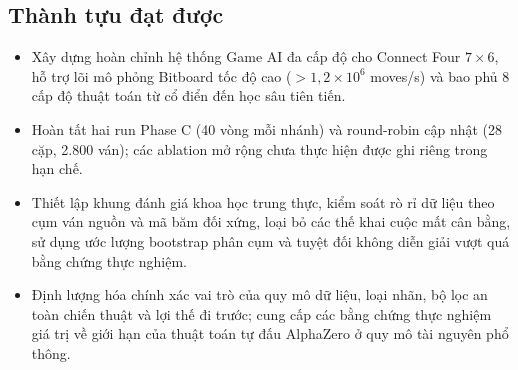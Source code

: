 \documentclass[11pt, a4paper]{article}
\begin{document}
\subsection{Thành tựu đạt được}
\begin{itemize}
    \item Xây dựng hoàn chỉnh hệ thống Game AI đa cấp độ cho Connect Four $7 \times 6$, hỗ trợ lõi mô phỏng Bitboard tốc độ cao ($>1{,}2 \times 10^6$ moves/s) và bao phủ 8 cấp độ thuật toán từ cổ điển đến học sâu tiên tiến.
    \item Hoàn tất hai run Phase C (40 vòng mỗi nhánh) và round-robin cập nhật (28 cặp, 2.800 ván); các ablation mở rộng chưa thực hiện được ghi riêng trong hạn chế.
    \item Thiết lập khung đánh giá khoa học trung thực, kiểm soát rò rỉ dữ liệu theo cụm ván nguồn và mã băm đối xứng, loại bỏ các thế khai cuộc mất cân bằng, sử dụng ước lượng bootstrap phân cụm và tuyệt đối không diễn giải vượt quá bằng chứng thực nghiệm.
    \item Định lượng hóa chính xác vai trò của quy mô dữ liệu, loại nhãn, bộ lọc an toàn chiến thuật và lợi thế đi trước; cung cấp các bằng chứng thực nghiệm giá trị về giới hạn của thuật toán tự đấu AlphaZero ở quy mô tài nguyên phổ thông.
\end{itemize}
\end{document}
